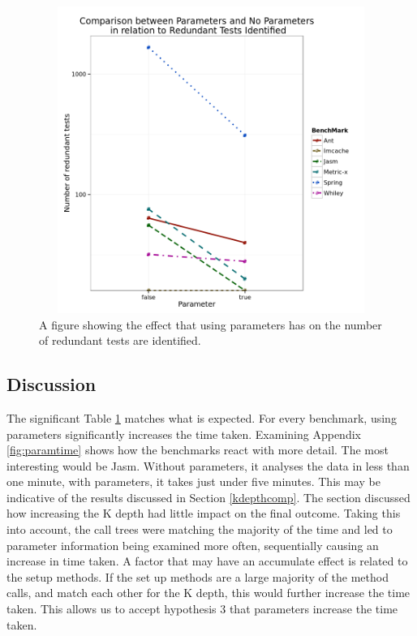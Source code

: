 \begin{figure}[h]
\begin{center}
\includegraphics[height=10cm, width = 14.5cm]{Parameters.png}
\end{center}
\caption{A figure showing the effect that using parameters has on the number of redundant tests are identified.}
\label{fig:paramgraph}
\end{figure}


\subsection{Discussion}
The significant Table \ref{fig:paramgraph} matches what is expected. For every benchmark, using parameters significantly increases the time taken. Examining Appendix \ref{fig:paramtime} shows how the benchmarks react with more detail. The most interesting would be Jasm. Without parameters, it analyses the data in less than one minute, with parameters, it takes just under five minutes. This may be indicative of the results discussed in Section \ref{kdepthcomp}. The section discussed how increasing the K depth had little impact on the final outcome. Taking this into account, the call trees were matching the majority of the time and led to parameter information being examined more often, sequentially causing an increase in time taken. A factor that may have an accumulate effect is related to the setup methods. If the set up methods are a large majority of the method calls, and match each other for the K depth, this would further increase the time taken. This allows us to accept hypothesis 3 that parameters increase the time taken.

